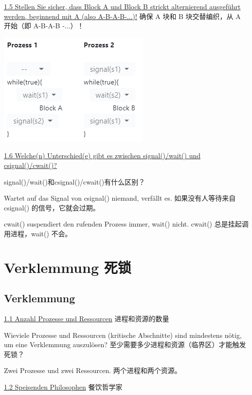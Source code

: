 \documentclass[fleqn]{article}
\begin{document}
\noindent\uline{1.5 Stellen Sie sicher, dass Block A und Block B strickt alternierend ausgeführt werden, beginnend mit A (also A-B-A-B-...)!}
确保 A 块和 B 块交替编织，从 A 开始（即 A-B-A-B -...）！

\begin{center}
    \includegraphics{30.png}
\end{center}


\noindent\uline{1.6 Welche(n) Unterschied(e) gibt es zwischen signal()/wait() und csignal()/cwait()?}

signal()/wait()和csignal()/cwait()有什么区别？

Wartet auf das Signal von csignal() niemand, verfällt es.
如果没有人等待来自 csignal() 的信号，它就会过期。

cwait() suspendiert den rufenden Prozess immer, wait() nicht.
cwait() 总是挂起调用进程，wait() 不会。





\section{Verklemmung 死锁}

\subsection{Verklemmung}

\noindent\uline{1.1	Anzahl Prozesse und Ressourcen} 进程和资源的数量

\noindent Wieviele Prozesse und Ressourcen (kritische Abschnitte) sind mindestens nötig, um eine Verklemmung auszulösen?
至少需要多少进程和资源（临界区）才能触发死锁？

Zwei Prozesse und zwei Ressourcen. 两个进程和两个资源。

\noindent\uline{1.2 Speisenden Philosophen} 餐饮哲学家
\end{document}
